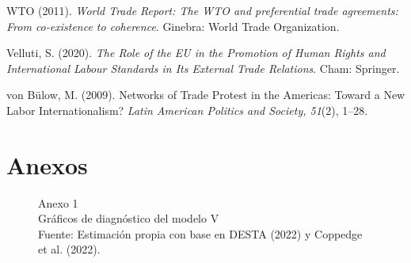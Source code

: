 \documentclass[a4paper]{tufte-handout}
\begin{document}
\begin{list}{}
\item{\small WTO (2011). {\itshape World Trade Report: The WTO and preferential trade agreements: From co-existence to coherence}. Ginebra: World Trade Organization.}

\item{\small Velluti, S. (2020). {\itshape The Role of the EU in the Promotion of Human Rights and International Labour Standards in Its External Trade Relations}. Cham: Springer.}

\item{\small von Bülow, M. (2009). Networks of Trade Protest in the Americas: Toward a New Labor Internationalism? {\itshape Latin American Politics and Society, 51}(2), 1--28.}

\end{list}


\section{{\normalfont Anexos}}


\begin{figure}[h!]
\captionsetup[subfigure]{labelformat=empty}
  \centering
  \smallskip\noindent\small Anexo 1 \\ Gráficos de diagnóstico del modelo V
  \\ \smallskip\noindent\scriptsize Fuente: Estimación propia con base en DESTA (2022) y Coppedge et al. (2022).
\end{figure}
\pagebreak
\end{document}
